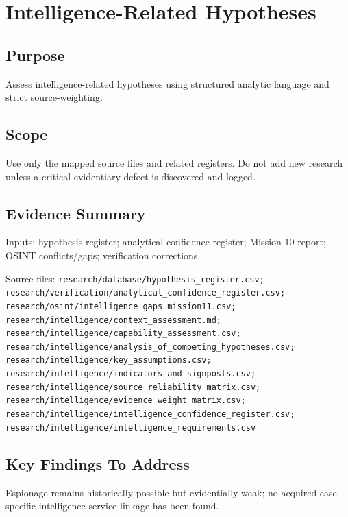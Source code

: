 
\chapter{Intelligence-Related Hypotheses}
\label{chap:10-intelligence-hypotheses}


\section{Purpose}
Assess intelligence-related hypotheses using structured analytic language and strict source-weighting.

\section{Scope}
Use only the mapped source files and related registers. Do not add new research unless a critical evidentiary defect is discovered and logged.

\section{Evidence Summary}
Inputs: hypothesis register; analytical confidence register; Mission 10 report; OSINT conflicts/gaps; verification corrections.

Source files: \texttt{research/database/hypothesis_register.csv; research/verification/analytical_confidence_register.csv; research/osint/intelligence_gaps_mission11.csv; research/intelligence/context_assessment.md; research/intelligence/capability_assessment.csv; research/intelligence/analysis_of_competing_hypotheses.csv; research/intelligence/key_assumptions.csv; research/intelligence/indicators_and_signposts.csv; research/intelligence/source_reliability_matrix.csv; research/intelligence/evidence_weight_matrix.csv; research/intelligence/intelligence_confidence_register.csv; research/intelligence/intelligence_requirements.csv}

\section{Key Findings To Address}
Espionage remains historically possible but evidentially weak; no acquired case-specific intelligence-service linkage has been found.

